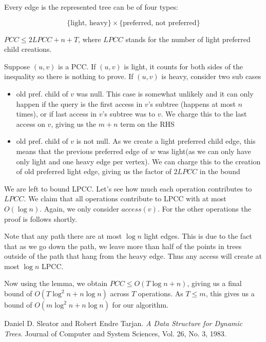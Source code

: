 \documentclass[11pt]{article}
\begin{document}
 Every edge is the represented tree can be of four types:

$$\{\text{light, heavy}\} \times \{\text{preferred, not preferred}\}$$

 $PCC\leq 2LPCC+n+T$, where $LPCC$ stands for the number of light preferred child creations.

 Suppose $(u,v)$ is a PCC. If $(u,v)$ is light, it counts for both sides of the inequality so there is nothing to prove. If $(u,v)$ is heavy, consider two sub cases
\begin{itemize}
	\item old  pref. child of $v$ was null. This case is somewhat unlikely and it can only happen if the query is the first access in $v$'s subtree (happens at most $n$ times), or if last access in $v$'s subtree was to $v$. We charge this to the last access on $v$, giving us the $m+n$ term on the RHS
	\item old pref. child of $v$ is not null. As we create a light preferred child edge, this means that the previous preferred edge of $w$ was light(as we can only have only light and one heavy edge per vertex). We can charge this to the creation of old preferred light edge, giving us the factor of $2LPCC$ in the bound
\end{itemize}

We are left to bound LPCC. Let's see how much each operation contributes to $LPCC$. We claim that all operations contribute to LPCC with at most $O(\log n)$. Again, we only consider $access(v)$.  For the other operations the proof is follows shortly.

Note that any path there are at most $\log n$ light edges. This is due to the fact that as we go down the path, we leave more than half of the points in trees outside of the path that hang from the heavy edge. Thus any access will create at most $\log n$ LPCC.

Now using the lemma, we obtain $PCC\leq O(T\log n+n)$, giving us a final bound of $O(T\log^2n+n\log n)$  across $T$ operations. As $T\leq m$, this gives us a bound of $O(m\log^2 n+n\log n)$ for our algorithm.
	

\begin{thebibliography}{1}
	Daniel D. Sleator and Robert Endre Tarjan.
	\textit{A Data Structure for Dynamic Trees}.
	Journal of Computer and System Sciences, Vol. 26, No. 3, 1983.
\end{thebibliography}
	
\end{document}
